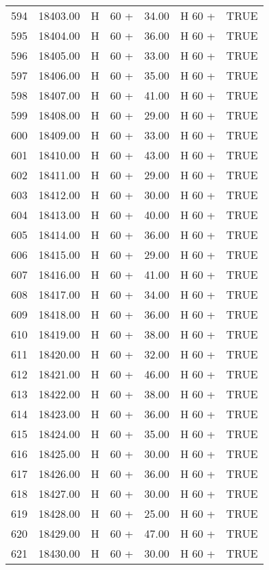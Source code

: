 \begin{table}[ht]
\begin{tabular}{rrllrll}
  594 & 18403.00 & H & 60 + & 34.00 & H 60 + & TRUE \\ 
  595 & 18404.00 & H & 60 + & 36.00 & H 60 + & TRUE \\ 
  596 & 18405.00 & H & 60 + & 33.00 & H 60 + & TRUE \\ 
  597 & 18406.00 & H & 60 + & 35.00 & H 60 + & TRUE \\ 
  598 & 18407.00 & H & 60 + & 41.00 & H 60 + & TRUE \\ 
  599 & 18408.00 & H & 60 + & 29.00 & H 60 + & TRUE \\ 
  600 & 18409.00 & H & 60 + & 33.00 & H 60 + & TRUE \\ 
  601 & 18410.00 & H & 60 + & 43.00 & H 60 + & TRUE \\ 
  602 & 18411.00 & H & 60 + & 29.00 & H 60 + & TRUE \\ 
  603 & 18412.00 & H & 60 + & 30.00 & H 60 + & TRUE \\ 
  604 & 18413.00 & H & 60 + & 40.00 & H 60 + & TRUE \\ 
  605 & 18414.00 & H & 60 + & 36.00 & H 60 + & TRUE \\ 
  606 & 18415.00 & H & 60 + & 29.00 & H 60 + & TRUE \\ 
  607 & 18416.00 & H & 60 + & 41.00 & H 60 + & TRUE \\ 
  608 & 18417.00 & H & 60 + & 34.00 & H 60 + & TRUE \\ 
  609 & 18418.00 & H & 60 + & 36.00 & H 60 + & TRUE \\ 
  610 & 18419.00 & H & 60 + & 38.00 & H 60 + & TRUE \\ 
  611 & 18420.00 & H & 60 + & 32.00 & H 60 + & TRUE \\ 
  612 & 18421.00 & H & 60 + & 46.00 & H 60 + & TRUE \\ 
  613 & 18422.00 & H & 60 + & 38.00 & H 60 + & TRUE \\ 
  614 & 18423.00 & H & 60 + & 36.00 & H 60 + & TRUE \\ 
  615 & 18424.00 & H & 60 + & 35.00 & H 60 + & TRUE \\ 
  616 & 18425.00 & H & 60 + & 30.00 & H 60 + & TRUE \\ 
  617 & 18426.00 & H & 60 + & 36.00 & H 60 + & TRUE \\ 
  618 & 18427.00 & H & 60 + & 30.00 & H 60 + & TRUE \\ 
  619 & 18428.00 & H & 60 + & 25.00 & H 60 + & TRUE \\ 
  620 & 18429.00 & H & 60 + & 47.00 & H 60 + & TRUE \\ 
  621 & 18430.00 & H & 60 + & 30.00 & H 60 + & TRUE \\ 

\end{tabular}
\end{table}

